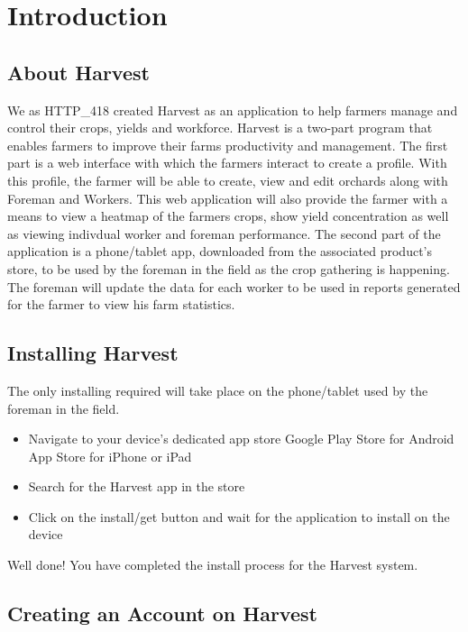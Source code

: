 \documentclass[11pt,fleqn]{book} %
\begin{document}

\chapter{Introduction}
	\section{About Harvest}
		We as HTTP\_418 created Harvest as an application to help farmers manage and control their crops, yields and workforce. Harvest is a two-part program that enables farmers to improve their farms productivity and management. The first part is a web interface with which the farmers interact to create a profile. With this profile, the farmer will be able to create, view and edit orchards along with Foreman and Workers. This web application will also provide the farmer with a means to view a heatmap of the farmers crops, show yield concentration as well as viewing indivdual worker and foreman performance. The second part of the application is a phone/tablet app, downloaded from the associated product's store, to be used by the foreman in the field as the crop gathering is happening. The foreman will update the data for each worker to be used in reports generated for the farmer to view his farm statistics.
	\section{Installing Harvest}
		The only installing required will take place on the phone/tablet used by the foreman in the field.
		\begin{itemize}
			\item Navigate to your device's dedicated app store
				\subitem Google Play Store for Android
				\subitem App Store for iPhone or iPad
			\item Search for the Harvest app in the store
			\item Click on the install/get button and wait for the application to install on the device
		\end{itemize}
		Well done! You have completed the install process for the Harvest system.
	\section{Creating an Account on Harvest}

\end{document}
